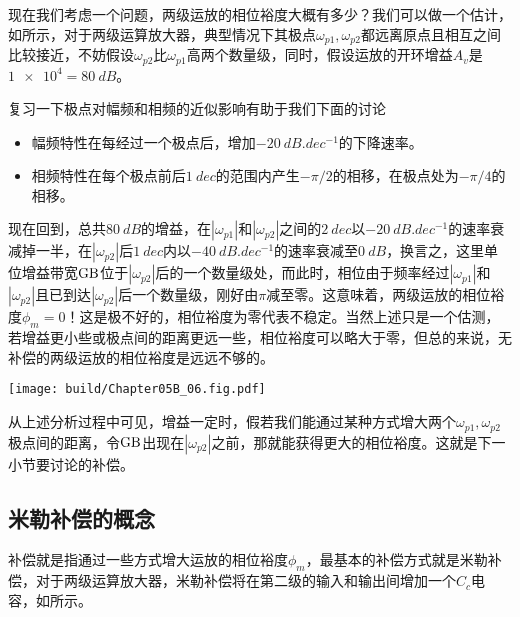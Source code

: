 
现在我们考虑一个问题，两级运放的相位裕度大概有多少？我们可以做一个估计，如所示，对于两级运算放大器，典型情况下其极点$\omega_{p1},\omega_{p2}$都远离原点且相互之间比较接近，不妨假设$\omega_{p2}$比$\omega_{p1}$高两个数量级，同时，假设运放的开环增益$A_v$是$\num{1e4}=\SI{80}{dB}$。

复习一下极点对幅频和相频的近似影响有助于我们下面的讨论
\begin{itemize}
    \item 幅频特性在每经过一个极点后，增加$\SI{-20}{dB.dec^{-1}}$的下降速率。
    \item 相频特性在每个极点前后$\SI{1}{dec}$的范围内产生$-\pi/2$的相移，在极点处为$-\pi/4$的相移。
\end{itemize}
现在回到，总共$\SI{80}{dB}$的增益，在$|\omega_{p1}|$和$|\omega_{p2}|$之间的$\SI{2}{dec}$以$\SI{-20}{dB.dec^{-1}}$的速率衰减掉一半，在$|\omega_{p2}|$后$\SI{1}{dec}$内以$\SI{-40}{dB.dec^{-1}}$的速率衰减至$\SI{0}{dB}$，换言之，这里单位增益带宽$\text{GB}$位于$|\omega_{p2}|$后的一个数量级处，而此时，相位由于频率经过$|\omega_{p1}|$和$|\omega_{p2}|$且已到达$|\omega_{p2}|$后一个数量级，刚好由$\pi$减至零。这意味着，两级运放的相位裕度$\phi_m=0$！这是极不好的，相位裕度为零代表不稳定。当然上述只是一个估测，若增益更小些或极点间的距离更远一些，相位裕度可以略大于零，但总的来说，无补偿的两级运放的相位裕度是远远不够的。
\begin{Figure}[补偿前两级运放的频率响应]
    \texttt{[image: build/Chapter05B\_06.fig.pdf]}
\end{Figure}
从上述分析过程中可见，增益一定时，假若我们能通过某种方式增大两个$\omega_{p1},\omega_{p2}$极点间的距离，令$\text{GB}$出现在$|\omega_{p2}|$之前，那就能获得更大的相位裕度。这就是下一小节要讨论的补偿。

\subsection{米勒补偿的概念}
补偿就是指通过一些方式增大运放的相位裕度$\phi_m$，最基本的补偿方式就是米勒补偿，对于两级运算放大器，米勒补偿将在第二级的输入和输出间增加一个$C_c$电容，如所示。

